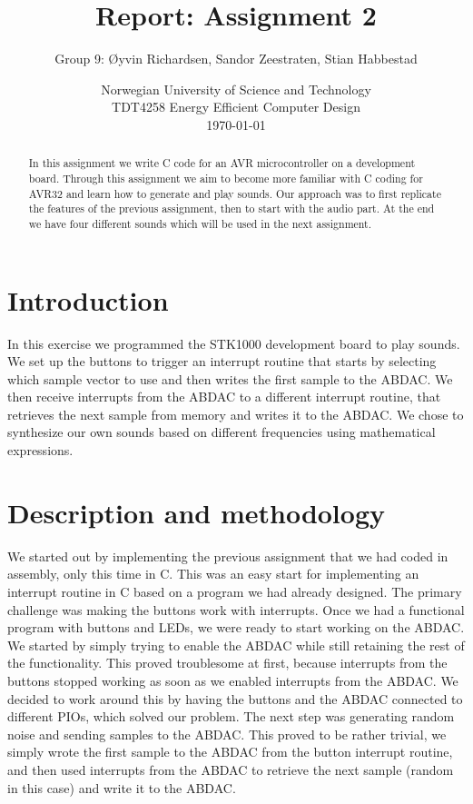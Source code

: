 \documentclass[a4paper,11pt]{article}
\title{\textbf{Report: Assignment 2}}
\author{Group 9: \O yvin Richardsen, Sandor Zeestraten, Stian Habbestad}
\date{{Norwegian University of Science and Technology \\
TDT4258 Energy Efficient Computer Design \\}
\today}
\begin{document}
\maketitle

\begin{abstract}
In this assignment we write C code for an AVR microcontroller on a development board. Through this assignment we aim to become more familiar with C coding for AVR32 and learn how to generate and play sounds. Our approach was to first replicate the features of the previous assignment, then to start with the audio part. At the end we have four different sounds which will be used in the next assignment.
\end{abstract}

\tableofcontents
\newpage

\section{Introduction}
In this exercise we programmed the STK1000 development board to play sounds. We set up the buttons to trigger an interrupt routine that starts by selecting which sample vector to use and then writes the first sample to the ABDAC. We then receive interrupts from the ABDAC to a different interrupt routine, that retrieves the next sample from memory and writes it to the ABDAC. We chose to synthesize our own sounds based on different frequencies using mathematical expressions. 

\section{Description and methodology}
We started out by implementing the previous assignment that we had coded in assembly, only this time in C. This was an easy start for implementing an interrupt routine in C based on a program we had already designed. The primary challenge was making the buttons work with interrupts. Once we had a functional program with buttons and LEDs, we were ready to start working on the ABDAC. We started by simply trying to enable the ABDAC while still retaining the rest of the functionality. This proved troublesome at first, because interrupts from the buttons stopped working as soon as we enabled interrupts from the ABDAC. We decided to work around this by having the buttons and the ABDAC connected to different PIOs, which solved our problem. The next step was generating random noise and sending samples to the ABDAC. This proved to be rather trivial, we simply wrote the first sample to the ABDAC from the button interrupt routine, and then used interrupts from the ABDAC to retrieve the next sample (random in this case) and write it to the ABDAC.
\end{document}
